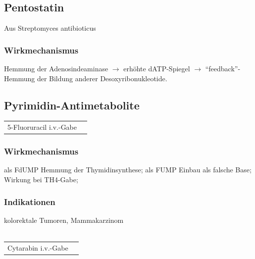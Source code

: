 \documentclass[10pt,a4paper]{report}
\begin{document}
\subsection{Pentostatin} %
\label{sub:pentostatin}
Aus Streptomyces antibioticus
\subsubsection{Wirkmechanismus} %
\label{par:wirkmechanismus}
Hemmung der Adenosindeaminase $\rightarrow$ erhöhte dATP-Spiegel $\rightarrow$ “feedback”-Hemmung der Bildung anderer Desoxyribonukleotide.
\subsection{Pyrimidin-Antimetabolite} %
\label{sub:pyrimidin_antimetabolite}
\begin{tabularx}{\textwidth}{XX}
5-Fluoruracil	i.v.-Gabe&\\  
\end{tabularx}
\subsubsection{Wirkmechanismus} %
\label{par:wirkmechanismus}
als FdUMP Hemmung der Thymidinsynthese; als FUMP Einbau als falsche Base; Wirkung bei TH4-Gabe; 
\subsubsection{Indikationen} %
\label{par:indikationen}
kolorektale Tumoren, Mammakarzinom\\ \\
\begin{tabularx}{\textwidth}{XX}
Cytarabin    i.v.-Gabe&\\  
\end{tabularx}
\end{document}
